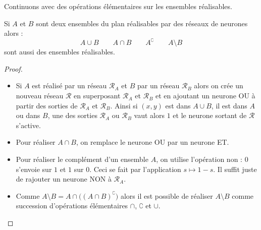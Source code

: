 \documentclass[11pt,class=report,crop=false]{standalone}
\begin{document}
Continuons avec des opérations élémentaires sur les ensembles réalisables.
\begin{proposition}
Si $A$ et $B$ sont deux ensembles du plan réalisables par des réseaux de neurones alors :
$$A\cup B \qquad A\cap B \qquad A^\complement  \qquad A \setminus B$$
sont aussi des ensembles réalisables. 
\end{proposition}




\begin{proof}
~
\begin{itemize}
  \item Si $A$ est réalisé par un réseau $\mathcal{R}_A$ et $B$ par un réseau  $\mathcal{R}_B$
alors on crée un nouveau réseau $\mathcal{R}$ en superposant $\mathcal{R}_A$ et $\mathcal{R}_B$
et en ajoutant un neurone \og{}OU\fg{} à partir des sorties de $\mathcal{R}_A$ et $\mathcal{R}_B$.
Ainsi si $(x,y)$ est dans $A \cup B$, il est dans $A$ ou dans $B$, une des sorties  $\mathcal{R}_A$ ou $\mathcal{R}_B$ vaut alors $1$ et le neurone sortant de $\mathcal{R}$ s'active.



  \item Pour réaliser $A \cap B$, on remplace le neurone \og{}OU\fg{} par un neurone \og{}ET\fg{}.


  \item Pour réaliser le complément d'un ensemble $A$, on utilise l'opération \og{}non\fg{} : $0$ s'envoie sur $1$ et $1$ sur $0$. Ceci se fait par l'application 
  $s \mapsto 1-s$. Il suffit juste de rajouter un neurone \og{}NON\fg{} à $\mathcal{R}_A$.
 
  
  \item Comme $A \setminus B = A \cap \big((A\cap B)^\complement \big)$ alors 
  il est possible de réaliser $A \setminus B$ comme succession d'opérations élémentaires $\cap$, $\complement$ et $\cup$.
\end{itemize}


\end{proof}

\end{document}

